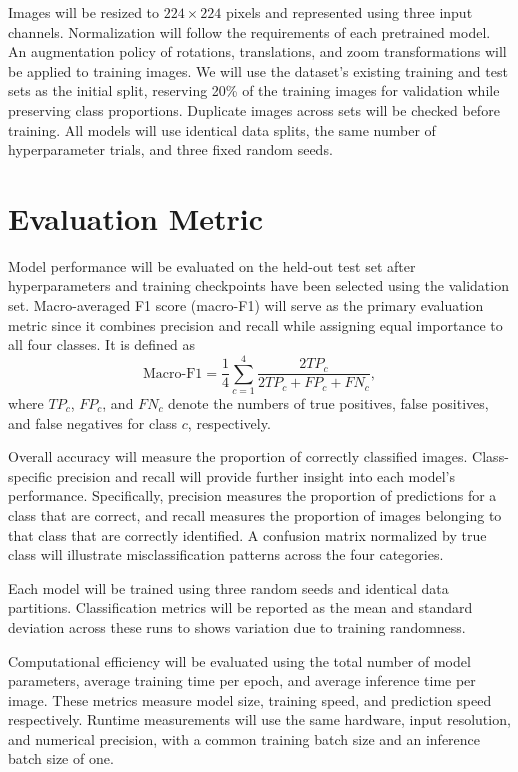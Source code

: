 \documentclass[11pt,letterpaper]{article}
\begin{document}
Images will be resized to \(224 \times 224\) pixels and represented using three input channels. Normalization will follow the requirements
of each pretrained model. An augmentation policy of rotations, translations, and zoom transformations will be applied to training images.
We will use the dataset's existing training and test sets as the initial split, reserving 20\% of the training images for validation while
preserving class proportions. Duplicate images across sets will be checked before training. All models will use identical data splits,
the same number of hyperparameter trials, and three fixed random seeds.

\section*{Evaluation Metric}
Model performance will be evaluated on the held-out test set after hyperparameters and training checkpoints have been selected using the
validation set. Macro-averaged F1 score (macro-F1) will serve as the primary evaluation metric since it combines precision and recall while
assigning equal importance to all four classes. It is defined as
\[
\mathrm{Macro\text{-}F1}
=\frac{1}{4}\sum_{c=1}^{4}
\frac{2TP_c}{2TP_c+FP_c+FN_c},
\]
where \(TP_c\), \(FP_c\), and \(FN_c\) denote the numbers of true positives, false positives, and false negatives for class \(c\), respectively.

Overall accuracy will measure the proportion of correctly classified images. Class-specific precision and recall will provide further insight
into each model's performance. Specifically, precision measures the proportion of predictions for a class that are correct, and recall measures the
proportion of images belonging to that class that are correctly identified. A confusion matrix normalized by true class will illustrate
misclassification patterns across the four categories.

Each model will be trained using three random seeds and identical data partitions. Classification metrics will be reported as the mean and
standard deviation across these runs to shows variation due to training randomness.

Computational efficiency will be evaluated using the total number of model parameters, average training time per epoch, and average inference
time per image. These metrics measure model size, training speed, and prediction speed respectively. Runtime measurements will use the
same hardware, input resolution, and numerical precision, with a common training batch size and an inference batch size of one.
\end{document}
